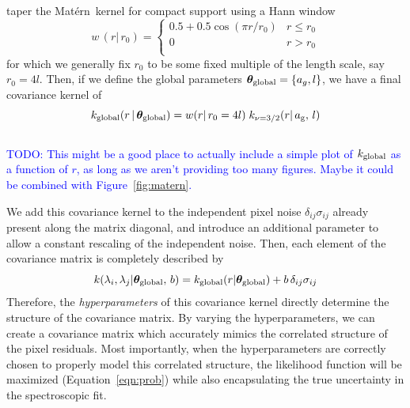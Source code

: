 \documentclass[preprint]{aastex} %
\newcommand{\vt}{ {\bm \theta}}
\newcommand{\vtglobal}{\vt_{\rm global}}
\newcommand{\matern}{Mat\'{e}rn}
\newcommand{\todo}[1]{ \textcolor{Blue}{\\TODO: #1}}
\begin{document}
 taper the \matern\ kernel for compact support using a Hann window
\begin{equation}
  w\,(r |\, r_0) = \left \{ 
    \begin{array}{cc}
    0.5 + 0.5 \cos (\pi r/ r_0 ) & r \le r_0 \\
    0 & r > r_0\\
  \end{array}
  \right .
  \label{eqn:Hann}
\end{equation}
for which we generally fix $r_0$ to be some fixed multiple of the length scale, say $r_0 = 4 l$. Then, if we define the global parameters $\vtglobal = \{a_g, l \}$, we have a final covariance kernel of 
\begin{equation}
  k_{\rm global} (r\,|\,\vtglobal) = w(r |\, r_0 = 4l)\; k_{\nu = 3/2}(r |\, a_{\rm g},\, l) 
  \label{eqn:global}
\end{equation}
\todo{This might be a good place to actually include a simple plot of $k_{\rm global}$ as a function of $r$, as long as we aren't providing too many figures. Maybe it could be combined with Figure~\ref{fig:matern}.}

We add this covariance kernel to the independent pixel noise $\delta_{ij} \sigma_{ij}$ already present along
 the matrix diagonal, and introduce an additional parameter to allow a constant rescaling of the independent noise. Then, each element of the covariance matrix is completely described by
\begin{equation}
  k(\lambda_i, \lambda_j |\vtglobal, \, b) = k_{\rm global}(r | \vtglobal) + b\,\delta_{ij} \sigma_{ij}
\end{equation}
Therefore, the \emph{hyperparameters} of this covariance kernel directly determine the structure of the covariance matrix. By varying the hyperparameters, we can create a covariance matrix which accurately mimics the correlated structure of the pixel residuals. Most importantly, when the hyperparameters are correctly chosen to properly model this correlated structure, the likelihood function will be maximized (Equation~\ref{eqn:prob}) while also encapsulating the true uncertainty in the spectroscopic fit.
 
\end{document}
